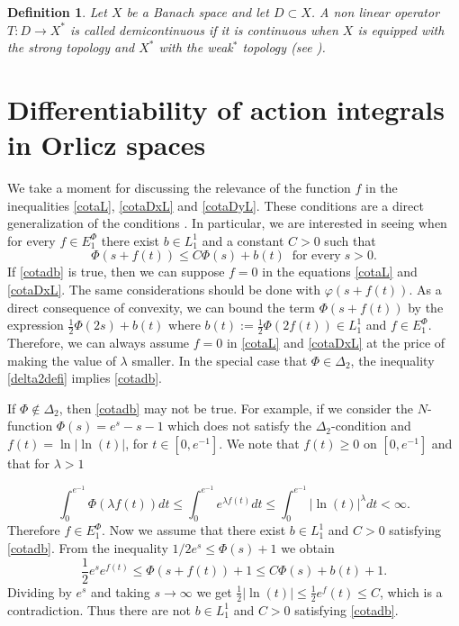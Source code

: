 \documentclass[twoside]{article}
\newtheorem{defi}[thm]{Definition}
\theoremstyle{remark}
\newcommand{\ephi}{E^{\Phi}}
\renewcommand{\leq}{\leqslant}
\begin{document}
\begin{defi} Let $X$ be a Banach space and let $D\subset X$. A non linear operator $T:D\to X^*$ is called \emph{demicontinuous} if it is continuous when $X$ is equipped with the strong topology and $X^*$ with the weak${}^*$ topology 
(see \cite{kato1964demicontinuity}).
\end{defi} 

\section{Differentiability of action integrals in Orlicz spaces}\label{sec:dif}





We take a moment for  discussing the relevance of the function $f$ in the inequalities \eqref{cotaL},  \eqref{cotaDxL} and \eqref{cotaDyL}. These conditions are a direct  generalization of the conditions \cite[Eq (a), p. 10]{mawhin2010critical}.  In particular, we are interested in seeing when for every  $f\in \ephi_1$ there exist
$b\in L^1_1$ and a constant $C>0$ such that 
\begin{equation}\label{cotadb}
\Phi(s+f(t))\leq C\Phi(s)+b(t)\;\;\mbox{for every}\;s>0.
\end{equation} 
If \eqref{cotadb} is true, then we can suppose $f=0$  in the equations \eqref{cotaL} and \eqref{cotaDxL}. The same considerations should be done with $\varphi\left(s+f(t)\right)$.
 As a direct consequence of convexity, we can  bound the term $\Phi(s+f(t))$ by the expression  $\frac12\Phi(2s)+b(t)$ where $b(t):=\tfrac12\Phi(2f(t))\in L^1_1$ and $f\in \ephi_1$. Therefore, we can always assume $f = 0$ in \eqref{cotaL} and \eqref{cotaDxL} at the price of making  the value of $\lambda$ smaller. In the special case that $\Phi\in\Delta_2$, the inequality \eqref{delta2defi} implies \eqref{cotadb}. 

 If $\Phi\notin\Delta_2$, then \eqref{cotadb}  may not be true.  For example, if we consider the $N$-function $\Phi(s)=e^s-s-1$ which does not satisfy the $\Delta_2$-condition and $f(t)=\ln|\ln(t)|$, for $t\in [0,e^{-1}]$. We note that $f(t)\geq 0$ on $[0,e^{-1}]$ and that for $\lambda>1$

\[\int_0^{e^{-1}}\Phi(\lambda f(t))dt\leq 
\int_0^{e^{-1}}e^{\lambda f(t)}dt\leq \int_0^{e^{-1}}|\ln(t)|^{\lambda}dt<\infty.\]
Therefore $f\in\ephi_1$. Now we assume that there exist $b\in L^1_1$ and $C>0$ satisfying \eqref{cotadb}. From the inequality 
 $1/2e^s\leq \Phi(s)+1$ we obtain
\[\frac12 e^se^{f(t)}\leq \Phi(s+f(t))+1\leq C\Phi(s)+b(t)+1.\]
Dividing by $e^s$ and taking $s\to\infty$ we get $\tfrac12|\ln(t)|\leq\tfrac12 e^f(t)\leq C$, which is a contradiction. Thus there are not $b\in L^1_1$ and $C>0$ satisfying \eqref{cotadb}.
\end{document}
